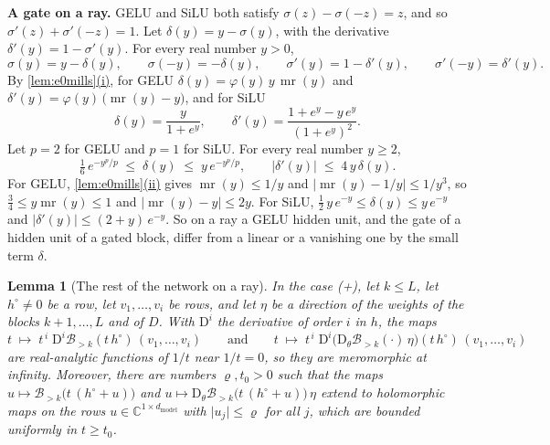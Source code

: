 \documentclass[10pt]{article}
\newtheorem{lemma}[theorem]{Lemma}
\theoremstyle{definition}
\theoremstyle{remark}
\newcommand{\dm}{d_{\mathrm{model}}}
\newcommand{\Der}{\mathrm{D}}
\newcommand{\para}[1]{\smallskip\noindent\textbf{#1}\hspace{0.5em}}
\DeclareRobustCommand{\cpref}[2]{\hyperref[#1:#2]{\cref*{#1}(#2)}}
\begin{document}
\para{A gate on a ray.} GELU and SiLU both satisfy $\sigma(z) - \sigma(-z) = z$, and so $\sigma'(z) + \sigma'(-z) = 1$. Let $\delta(y) = y - \sigma(y)$, with the derivative $\delta'(y) = 1 - \sigma'(y)$. For every real number $y > 0$,
\begin{equation}\label{eq:sbunit}
\sigma(y) = y - \delta(y), \qquad \sigma(-y) = -\delta(y), \qquad \sigma'(y) = 1 - \delta'(y), \qquad \sigma'(-y) = \delta'(y) .
\end{equation}
By \cpref{lem:e0mills}{i}, for GELU $\delta(y) = \varphi(y)\,y\,\operatorname{mr}(y)$ and $\delta'(y) = \varphi(y)\,\big(\operatorname{mr}(y) - y\big)$, and for SiLU
\[
\delta(y) = \frac{y}{1 + e^{y}}, \qquad \delta'(y) = \frac{1 + e^{y} - y\,e^{y}}{(1 + e^{y})^2} .
\]
Let $p = 2$ for GELU and $p = 1$ for SiLU. For every real number $y \ge 2$,
\begin{equation}\label{eq:gtdelta}
\tfrac16\,e^{-y^p/p} \;\le\; \delta(y) \;\le\; y\,e^{-y^p/p}, \qquad \lvert\delta'(y)\rvert \;\le\; 4\,y\,\delta(y) .
\end{equation}
For GELU, \cpref{lem:e0mills}{ii} gives $\operatorname{mr}(y) \le 1/y$ and $\lvert\operatorname{mr}(y) - 1/y\rvert \le 1/y^3$, so $\frac34 \le y\operatorname{mr}(y) \le 1$ and $\lvert\operatorname{mr}(y) - y\rvert \le 2y$. For SiLU, $\frac12\,y\,e^{-y} \le \delta(y) \le y\,e^{-y}$ and $\lvert\delta'(y)\rvert \le (2 + y)\,e^{-y}$. So on a ray a GELU hidden unit, and the gate of a hidden unit of a gated block, differ from a linear or a vanishing one by the small term $\delta$.

\begin{lemma}[The rest of the network on a ray]\label{lem:sbcoeff}
In the case (+), let $k \le L$, let $h^\circ \neq 0$ be a row, let $v_1, \dots, v_i$ be rows, and let $\eta$ be a direction of the weights of the blocks $k+1, \dots, L$ and of $D$. With $\Der^i$ the derivative of order $i$ in $h$, the maps
\[
t \;\mapsto\; t^{\,i}\;\Der^{i}\mathcal B_{>k}(t\,h^\circ)\,(v_1, \dots, v_i) \qquad\text{and}\qquad t \;\mapsto\; t^{\,i}\;\Der^{i}\big(\Der_\theta\mathcal B_{>k}(\cdot)\,\eta\big)(t\,h^\circ)\,(v_1, \dots, v_i)
\]
are real-analytic functions of $1/t$ near $1/t = 0$, so they are meromorphic at infinity. Moreover, there are numbers $\varrho, t_0 > 0$ such that the maps $u \mapsto \mathcal B_{>k}\big(t\,(h^\circ + u)\big)$ and $u \mapsto \Der_\theta\mathcal B_{>k}\big(t\,(h^\circ + u)\big)\,\eta$ extend to holomorphic maps on the rows $u \in \mathbb C^{1\times\dm}$ with $\lvert u_j\rvert \le \varrho$ for all $j$, which are bounded uniformly in $t \ge t_0$.
\end{lemma}
\end{document}
